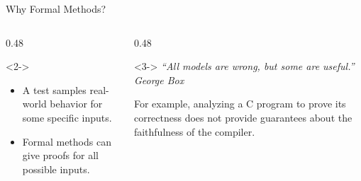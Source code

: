 \begin{frame}{Why Formal Methods?}


  \vspace{0.3em}

  \begin{columns}[T,onlytextwidth]
    \begin{column}{0.48\textwidth}
      \begin{block}<2->{}
        \small
        \begin{itemize}
          \item A test samples real-world behavior for some specific inputs.
          \item Formal methods can give proofs for all possible inputs.
        \end{itemize}
        \par\vspace{0.45em}
      \end{block}
    \end{column}

    \begin{column}{0.48\textwidth}
      \begin{block}<3->{}
        \small
        \itshape ``All models are wrong, but some are useful.''
        \hfill \normalfont\textcolor{palGray}{George Box}
        \par\vspace{0.5em}
        For example, analyzing a C program to prove its correctness does not provide guarantees about the faithfulness of the compiler.
      \end{block}
    \end{column}
  \end{columns}


\end{frame}
